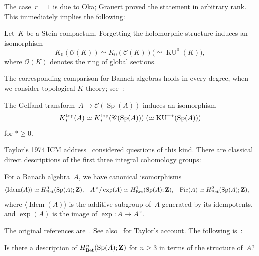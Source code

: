 \documentclass[11pt,a4paper]{amsart}
\numberwithin{equation}{section}
\theoremstyle{plain}
\theoremstyle{definition}
\theoremstyle{remark}
\newcommand{\ZZ}{\mathbf{Z}}
\newcommand{\top}{\textnormal{top}}
\newcommand{\Bet}{\textnormal{Bet}}
\newcommand{\Idem}{\operatorname{Idem}}
\newcommand{\KU}{\operatorname{KU}}
\newcommand{\Pic}{\operatorname{Pic}}
\newcommand{\Sp}{\operatorname{Sp}}
\newcommand{\Cls}[1]{\mathscr{#1}}
\begin{document}
The case~\(r=1\) is due to Oka;
Grauert proved the statement in arbitrary rank.
This immediately implies the following:

\begin{corollary}\label{xsyq8z}
  Let~\(K\) be a Stein compactum.
  Forgetting the holomorphic structure induces an isomorphism
  \begin{equation*}
    K_{0}(\Cls{O}(K))\simeq
    K_{0}(\Cls{C}(K))\mathrel{(\simeq}
    \KU^{0}(K)),
  \end{equation*}
  where \(\Cls{O}(K)\) denotes the ring
  of global sections.
\end{corollary}

The corresponding comparison
for Banach algebras holds in every degree,
when we consider topological \(K\)-theory;
see~\cite{Novodvorskii67,BraddHigson21}:

\begin{theorem}[Novodvorskii]\label{novodvorskii}
  The Gelfand transform~\(A\to\Cls{C}(\Sp(A))\) induces an
  isomorphism
  \begin{equation*}
    K^{\top}_{*}(A)\simeq
    K^{\top}_{*}(\Cls{C}(\Sp(A)))\mathrel{(\simeq}
    \KU^{-{*}}(\Sp(A)))
  \end{equation*}
  for \({*}\geq0\).
\end{theorem}

Taylor’s 1974 ICM address~\cite{Taylor75}
considered questions of this kind.
There are classical direct descriptions
of the first three integral cohomology groups:

\begin{theorem}\label{classical}
  For a Banach algebra~\(A\),
  we have canonical isomorphisms
  \begin{align*}
    \langle \Idem(A)\rangle&\simeq H^{0}_{\Bet}(\Sp(A);\ZZ),&
    A^{\times}/\exp(A)&\simeq H^{1}_{\Bet}(\Sp(A);\ZZ),&
    \Pic(A)&\simeq H^{2}_{\Bet}(\Sp(A);\ZZ),
  \end{align*}
  where \(\langle\Idem(A)\rangle\)
  is the additive subgroup of~\(A\)
  generated by its idempotents,
  and \(\exp(A)\) is the image
  of \({\exp}\colon A\to A^{\times}\).
\end{theorem}

The original references
are~\cite{Shilov53,Arens63,Royden63,Forster74}.
See also~\cite{Taylor76} for Taylor’s account.
The following is~\cite[Problem~1]{Taylor75}:

\begin{question}[Taylor]\label{xqo4z1}
  Is there a description of
  \(H^{n}_{\Bet}(\Sp(A);\ZZ)\) for \(n\geq3\)
  in terms of the structure of~\(A\)?
\end{question}
\end{document}
